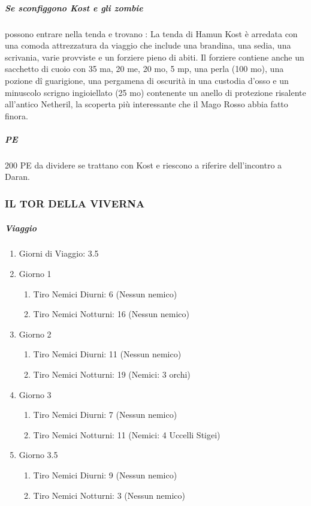 \documentclass{article}
\begin{document}
\subparagraph{Se sconfiggono Kost e gli zombie} possono entrare nella tenda e trovano : La tenda di Hamun Kost è arredata con una comoda
attrezzatura da viaggio che include una brandina, una sedia,
una scrivania, varie provviste e un forziere pieno di abiti. Il
forziere contiene anche un sacchetto di cuoio con 35 ma,
20 me, 20 mo, 5 mp, una perla (100 mo), una pozione dî
guarigione, una pergamena di oscurità in una custodia d'osso
e un minuscolo scrigno ingioiellato (25 mo) contenente un
anello di protezione risalente all'antico Netheril, la scoperta
più interessante che il Mago Rosso abbia fatto finora.

\subparagraph{PE} 200 PE da dividere se trattano con Kost e riescono a riferire dell'incontro a Daran. 

\subsubsection{IL TOR DELLA VIVERNA}
 \subparagraph{Viaggio} \begin{enumerate}
        \item Giorni di Viaggio: 3.5
        \item Giorno 1
                \begin{enumerate}
                    \item Tiro Nemici Diurni: 6 (Nessun nemico)
                    \item Tiro Nemici Notturni: 16 (Nessun nemico)
                \end{enumerate}
         \item Giorno 2
                \begin{enumerate}
                    \item Tiro Nemici Diurni: 11 (Nessun nemico)
                    \item Tiro Nemici Notturni: 19 (Nemici: 3 orchi)
                \end{enumerate}
         \item Giorno 3
                \begin{enumerate}
                    \item Tiro Nemici Diurni: 7 (Nessun nemico)
                    \item Tiro Nemici Notturni: 11 (Nemici: 4 Uccelli Stigei)
                \end{enumerate}
         \item Giorno 3.5
                \begin{enumerate}
                    \item Tiro Nemici Diurni: 9 (Nessun nemico)
                    \item Tiro Nemici Notturni: 3 (Nessun nemico)
                \end{enumerate}
    \end{enumerate}
\end{document}
